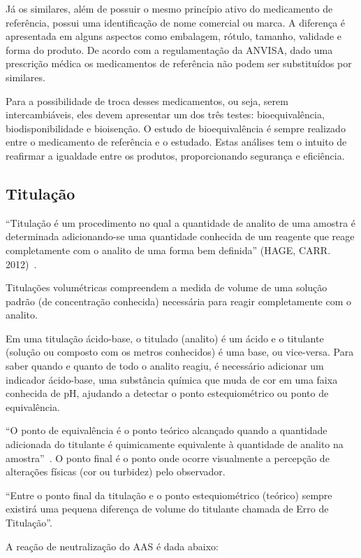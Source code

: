 Já os similares, além de possuir o mesmo princípio ativo do medicamento de referência, possui uma
identificação de nome comercial ou marca. A diferença é apresentada em alguns aspectos como
embalagem, rótulo, tamanho, validade e forma do produto. De acordo com a regulamentação da ANVISA,
dado uma prescrição médica os medicamentos de referência não podem ser substituídos por similares.

Para a possibilidade de troca desses medicamentos, ou seja, serem intercambiáveis, eles devem
apresentar um dos três testes: bioequivalência, biodisponibilidade e bioisenção. O estudo de
bioequivalência é sempre realizado entre o medicamento de referência e o estudado. Estas análises
tem o intuito de reafirmar a igualdade entre os produtos, proporcionando segurança e
eficiência.~\cite{ache2015}

\subsection{Titulação}\label{titulacao}

``Titulação é um procedimento no qual a quantidade de analito de uma amostra é determinada
adicionando-se uma quantidade conhecida de um reagente que reage completamente com o analito de uma
forma bem definida'' (HAGE, CARR. 2012)~\cite{Hage2012}.

Titulações volumétricas compreendem a medida de volume de uma solução padrão (de concentração
conhecida) necessária para reagir completamente com o analito.~\cite{Skoog2014}

Em uma titulação ácido-base, o titulado (analito) é um ácido e o titulante (solução ou composto com
os metros conhecidos) é uma base, ou vice-versa. Para saber quando e quanto de todo o analito
reagiu, é necessário adicionar um indicador ácido-base, uma substância química que muda de cor em
uma faixa conhecida de pH, ajudando a detectar o ponto estequiométrico ou ponto de equivalência.

``O ponto de equivalência é o ponto teórico alcançado quando a quantidade adicionada do titulante é
quimicamente equivalente à quantidade de analito na amostra''~\cite{Skoog2014}. O ponto final é o
ponto onde ocorre visualmente a percepção de alterações físicas (cor ou turbidez) pelo observador.

“Entre o ponto final da titulação e o ponto estequiométrico (teórico) sempre existirá uma pequena
diferença de volume do titulante chamada de Erro de Titulação”.~\cite{Ruy1999}

A reação de neutralização do AAS é dada abaixo:

